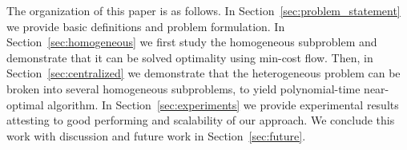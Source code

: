 \documentclass[conference]{IEEEtran}
\def\checkmark{\tikz\fill[scale=0.4](0,.35) -- (.25,0) -- (1,.7) -- (.25,.15) -- cycle;}
\newcommand{\frline}[2]{{\color{blue}#1}{\em \color{blue}[FR]: #2}}
\newcommand{\frline}[2]{#1}
\begin{document}


The organization of this paper is as follows. In Section~\ref{sec:problem_statement} we provide basic definitions and problem formulation. In Section~\ref{sec:homogeneous} we first study the homogeneous subproblem and demonstrate that it can be solved optimality using min-cost flow. Then, in Section~\ref{sec:centralized} we demonstrate that the heterogeneous problem can be broken into several homogeneous subproblems, to yield polynomial-time near-optimal algorithm.
In Section~\ref{sec:experiments} we provide experimental results attesting to good performing and scalability of our approach. We conclude this work with discussion and future work in Section~\ref{sec:future}.
\end{document}
